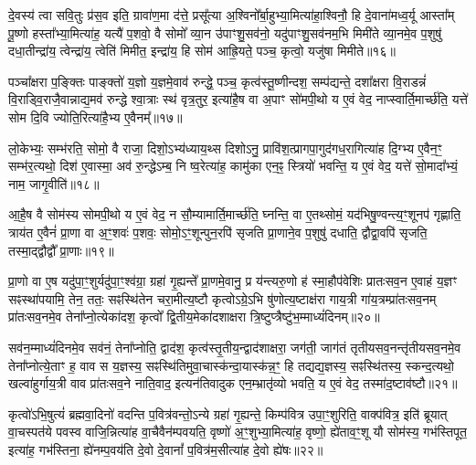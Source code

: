 {\anuvakamend[{वा॒चो हव॑म॒भिघृ॑तानां गृह्णात्यु॒त पञ्च॑विꣳशतिश्च॥३॥}]}

दे॒वस्य॑ त्वा सवि॒तुः प्र॑स॒व इति॒ ग्रावा॑ण॒मा द॑त्ते॒ प्रसू᳚त्या अ॒श्विनो᳚र्बा॒हुभ्या॒मित्या॑हा॒श्विनौ॒ हि दे॒वाना॑मध्व॒र्यू आस्ता᳚म् पू॒ष्णो हस्ता᳚भ्या॒मित्या॑ह॒ यत्यै॑ प॒शवो॒ वै सोमो᳚ व्या॒न उ॑पाꣳशु॒सव॑नो॒ यदु॑पाꣳशु॒सव॑नम॒भि मिमी॑ते व्या॒नमे॒व प॒शुषु॑ दधा॒तीन्द्रा॑य॒ त्वेन्द्रा॑य॒ त्वेति॑ मिमीत॒ इन्द्रा॑य॒ हि सोम॑ आह्रि॒यते॒ पञ्च॒ कृत्वो॒ यजु॑षा मिमीते॥१६॥

पञ्चा᳚क्षरा प॒ङ्क्तिः पाङ्क्तो॑ य॒ज्ञो य॒ज्ञमे॒वाव॑ रुन्द्धे॒ पञ्च॒ कृत्व॑स्तू॒ष्णीन्दश॒ सम्प॑द्यन्ते॒ दशा᳚क्षरा वि॒राडन्नं॑ वि॒राड्वि॒राजै॒वान्नाद्य॒मव॑ रुन्द्धे श्वा॒त्राः स्थ॑ वृत्र॒तुर॒ इत्या॑है॒ष वा अ॒पाꣳ सो॑मपी॒थो य ए॒वं वेद॒ नाप्स्वार्ति॒मार्च्छ॑ति॒ यत्ते॑ सोम दि॒वि ज्योति॒रित्या॑है॒भ्य ए॒वैनम्᳚॥१७॥

लो॒केभ्यः॒ सम्भ॑रति॒ सोमो॒ वै राजा॒ दिशो॒\-ऽभ्य॑ध्याय॒थ्स दिशो\-ऽनु॒ प्रावि॑श॒त्प्रागपा॒गुद॑गध॒रागित्या॑ह दि॒ग्भ्य ए॒वैन॒ꣳ॒ सम्भ॑र॒त्यथो॒ दिश॑ ए॒वास्मा॒ अव॑ रु॒न्द्धे\-ऽम्ब॒ नि ष्व॒रेत्या॑ह॒ कामु॑का एन॒ꣴ॒ स्त्रियो॑ भवन्ति॒ य ए॒वं वेद॒ यत्ते॑ सो॒मादा᳚भ्यं॒ नाम॒ जागृ॒वीति॑॥१८॥

आ॒है॒ष वै सोम॑स्य सोमपी॒थो य ए॒वं वेद॒ न सौ॒म्यामार्ति॒मार्च्छ॑ति॒ घ्नन्ति॒ वा ए॒तथ्सोमं॒ यद॑भिषु॒ण्वन्त्य॒ꣳ॒शूनप॑ गृह्णाति॒ त्राय॑त ए॒वैनं॑ प्रा॒णा वा अ॒ꣳ॒शवः॑ प॒शवः॒ सोमो॒\-ऽꣳ॒शून्पुन॒रपि॑ सृजति प्रा॒णाने॒व प॒शुषु॑ दधाति॒ द्वौद्वा॒वपि॑ सृजति॒ तस्मा॒द्द्वौद्वौ᳚ प्रा॒णाः॥१९॥

{\anuvakamend[{यजु॑षा मिमीत एनं॒ जागृ॒वीति॒ चतु॑श्चत्वारिꣳशच्च॥४॥}]}

प्रा॒णो वा ए॒ष यदु॑पा॒ꣳ॒शुर्यदु॑पा॒ꣳ॒श्व॑ग्रा॒ ग्रहा॑ गृ॒ह्यन्ते᳚ प्रा॒णमे॒वानु॒ प्र य॑न्त्यरु॒णो ह॑ स्मा॒हौप॑वेशिः प्रातःसव॒न ए॒वाहं य॒ज्ञꣳ सꣴस्था॑पयामि॒ तेन॒ ततः॒ सꣴस्थि॑तेन चरा॒मीत्य॒ष्टौ कृत्वो\-ऽग्रे॒\-ऽभि षु॑णोत्य॒ष्टाक्ष॑रा गाय॒त्री गा॑य॒त्रम्प्रा॑तःसव॒नम् प्रा॑तःसव॒नमे॒व तेना᳚प्नो॒त्येका॑दश॒ कृत्वो᳚ द्वि॒तीय॒मेका॑दशाक्षरा त्रि॒ष्टुप्त्रैष्टु॑भ॒म्माध्यं॑दिनम्॥२०॥

सव॑न॒म्माध्यं॑दिनमे॒व सव॑नं॒ तेना᳚प्नोति॒ द्वाद॑श॒ कृत्व॑स्तृ॒तीय॒न्द्वाद॑शाक्षरा॒ जग॑ती॒ जाग॑तं तृतीयसव॒नन्तृ॑तीयसव॒नमे॒व तेना᳚प्नोत्ये॒ताꣳ ह॒ वाव स य॒ज्ञस्य॒ सꣴस्थि॑तिमुवा॒चास्क॑न्दा॒यास्क॑न्न॒ꣳ॒ हि तद्यद्य॒ज्ञस्य॒ सꣴस्थि॑तस्य॒ स्कन्द॒त्यथो॒ खल्वा॑हुर्गाय॒त्री वाव प्रा॑तःसव॒ने नाति॒वाद॒ इत्यन॑तिवादुक एन॒म्भ्रातृ॑व्यो भवति॒ य ए॒वं वेद॒ तस्मा॑द॒ष्टाव॑ष्टौ॥२१॥

कृत्वो॑\-ऽभि॒षुत्यं॑ ब्रह्मवा॒दिनो॑ वदन्ति प॒वित्र॑वन्तो॒\-ऽन्ये ग्रहा॑ गृ॒ह्यन्ते॒ किम्प॑वित्र उपा॒ꣳ॒शुरिति॒ वाक्प॑वित्र॒ इति॑ ब्रूयात् वा॒चस्पत॑ये पवस्व वाजि॒न्नित्या॑ह वा॒चैवैन॑म्पवयति॒ वृष्णो॑ अ॒ꣳ॒शुभ्या॒मित्या॑ह॒ वृष्णो॒ ह्ये॑ताव॒ꣳ॒शू यौ सोम॑स्य॒ गभ॑स्तिपूत॒ इत्या॑ह॒ गभ॑स्तिना॒ ह्ये॑नम्प॒वय॑ति दे॒वो दे॒वानां᳚ प॒वित्र॑म॒सीत्या॑ह दे॒वो ह्ये॑षः॥२२॥

